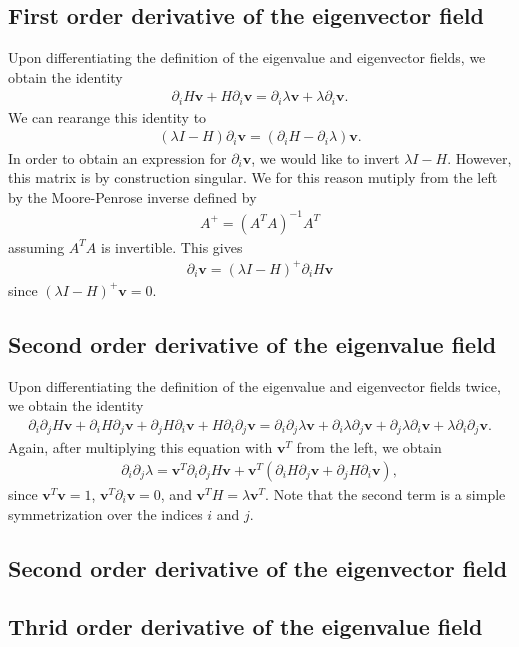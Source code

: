 \documentclass{article}
\begin{document}
\subsection{First order derivative of the eigenvector field}
Upon differentiating the definition of the eigenvalue and eigenvector fields, we obtain the identity 
\begin{align}
\partial_i H \bm{v} + H \partial_i \bm{v} = \partial_i \lambda \bm{v} + \lambda \partial_i \bm{v}.
\end{align}
We can rearange this identity to 
\begin{align}
(\lambda I - H) \partial_i \bm{v} = (\partial_i H - \partial_i \lambda )\bm{v}.
\end{align}
In order to obtain an expression for $\partial_i \bm{v}$, we would like to invert $\lambda I - H$. However, this matrix is by construction singular. We for this reason mutiply from the left by the Moore-Penrose inverse defined by
\begin{align}
A^+ = (A^T A)^{-1}A^T
\end{align}
assuming $A^T A$ is invertible. This gives
\begin{align}
\partial_i \bm{v} = (\lambda I - H)^+ \partial_i H \bm{v}
\end{align}
since $(\lambda I - H)^+ \bm{v}=0$.

\subsection{Second order derivative of the eigenvalue field}
Upon differentiating the definition of the eigenvalue and eigenvector fields twice, we obtain the identity 
\begin{align}
\partial_i \partial_j H \bm{v} + \partial_i H \partial_j \bm{v} + \partial_j H \partial_i \bm{v} + H \partial_i \partial_j \bm{v}
= \partial_i \partial_j \lambda \bm{v} + \partial_i \lambda \partial_j \bm{v}+ \partial_j \lambda \partial_i \bm{v} + \lambda \partial_i \partial_j \bm{v}.
\end{align}
Again, after multiplying this equation with $\bm{v}^T$ from the left, we obtain
\begin{align}
\partial_i \partial_j \lambda 
=
\bm{v}^T\partial_i \partial_j H \bm{v} + \bm{v}^T (\partial_i H \partial_j \bm{v} + \partial_j H \partial_i \bm{v} ),
\end{align}
since $\bm{v}^T\bm{v}=1$, $\bm{v}^T \partial_i \bm{v}=0$, and $\bm{v}^TH=\lambda \bm{v}^T$. Note that the second term is a simple symmetrization over the indices $i$ and $j$.

\subsection{Second order derivative of the eigenvector field}

\subsection{Thrid order derivative of the eigenvalue field}
\end{document}
